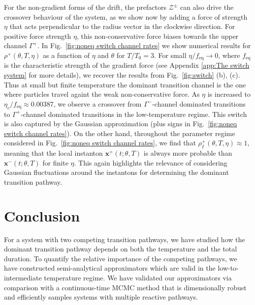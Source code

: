 For the non-gradient forms of the drift, the prefactors $\mathcal{Z^{\pm}}$
can also drive the crossover behaviour of the system, as we show now
by adding a force of strength $\eta$ that acts perpendicular to the
radius vector in the clockwise direction. For positive force strength
$\eta$, this non-conservative force biases towards the upper channel
$\Gamma^{+}$. In Fig.~\ref{fig:noneq switch channel rates} we show numerical
results for $\rho^{+}(\theta,T,\eta)$ as a function of $\eta$ and $\theta$
for $T/T_{0}=3$. For small $\eta/f_{\text{eq}}\rightarrow0$, where
$f_{\text{eq}}$ is the characteristic strength of the gradient force
(see Appendix \ref{app:The switch system} for more details), we recover the results from Fig.~\ref{fig:switch}
(b), (c). Thus at small but finite temperature the dominant transition
channel is the one where particles travel againt the weak non-conservative
force. As $\eta$ is increased to $\eta_{c}/f_{\text{eq}}\approx0.00387$,
we observe a crossover from $\Gamma^{-}$-channel dominated transitions
to $\Gamma^{+}$-channel dominated transitions in the low-temperature
regime. This switch is also captured by the Gaussian approximation
(plus signs in Fig.~\ref{fig:noneq switch channel rates}). On the other hand,
throughout the parameter regime considered in Fig.~\ref{fig:noneq switch channel rates},
we find that $\rho_{I}^{+}(\theta,T,\eta)\approx1$, meaning that the
local instanton $\mathbf{x}^{+}(t;\theta,T)$ is always more probable than $\mathbf{x}^{-}(t;\theta,T)$ for finite $\eta$. This again highlights the relevance of considering Gaussian fluctuations around the instantons for determining the dominant
transition pathway.

\section{Conclusion}

For a system with two competing transition pathways,
we have studied how the dominant transition pathway depends on both
the temperature and the total duration. To quantify the relative importance
of the competing pathways, we have constructed semi-analytical approximators
which are valid in the low-to-intermediate temperature regime. We
have validated our approximators via comparison with a continuous-time
MCMC method that is dimensionally robust and efficiently samples systems
with multiple reactive pathways.

